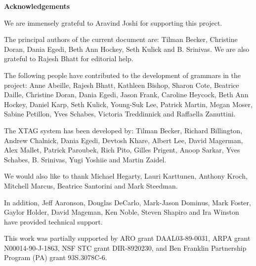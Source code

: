 \pagestyle{plain}
\null\vfil
\begin{center}
{\bf Acknowledgements}
\end{center}
\setcounter{page}{0}

We are immensely grateful to Aravind Joshi for supporting this
project. 

The principal authors of the current document are: Tilman Becker,
Christine Doran, Dania Egedi, Beth Ann Hockey, Seth Kulick and
B. Srinivas. We are also grateful to Rajesh Bhatt for editorial help.

The following people have contributed to the development of grammars
in the project: Anne Abeille, Rajesh Bhatt, Kathleen Bishop, Sharon
Cote, Beatrice Daille, Christine Doran, Dania Egedi, Jason Frank,
Caroline Heycock, Beth Ann Hockey, Daniel Karp, Seth Kulick, Young-Suk
Lee, Patrick Martin, Megan Moser, Sabine Petillon, Yves Schabes,
Victoria Treddinnick and Raffaella Zanuttini.

The XTAG system has been developed by: Tilman Becker, Richard
Billington, Andrew Chalnick, Dania Egedi, Devtosh Khare, Albert Lee,
David Magerman, Alex Mallet, Patrick Paroubek, Rich Pito, Gilles
Prigent, Anoop Sarkar, Yves Schabes, B. Srinivas, Yugi Yoshiie and
Martin Zaidel. 

We would also like to thank  Michael Hegarty, Lauri Karttunen, Anthony
Kroch, Mitchell Marcus, Beatrice Santorini and Mark Steedman.

In addition, Jeff Aaronson, Douglas DeCarlo, Mark-Jason Dominus, Mark
Foster, Gaylor Holder, David Mageman, Ken Noble, Steven Shapiro and
Ira Winston have provided technical support.

This work was partially supported by ARO grant DAAL03-89-0031, ARPA
grant N00014-90-J-1863, NSF STC grant DIR-8920230, and Ben Franklin
Partnership Program (PA) grant 93S.3078C-6. 

\newpage

